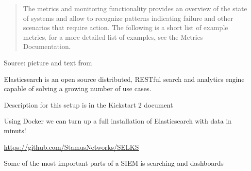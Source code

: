 \documentclass[Screen16to9,17pt]{foils}
\begin{document}

\begin{quote}
The metrics and monitoring functionality provides an overview of the state of systems and allow to recognize patterns indicating failure and other scenarios that require action. The following is a short list of example metrics, for a more detailed list of examples, see the Metrics Documentation.
\end{quote}


Source: picture and text from 






Elasticsearch is an open source distributed, RESTful search and analytics engine capable of solving a growing number of use cases.






\begin{list2}
\item Description for this setup is in the Kickstart 2 document
\item Using Docker we can turn up a full installation of Elasticsearch with data in minuts!
\item \url{https://github.com/StamusNetworks/SELKS}
\end{list2}




\begin{list2}
\item Some of the most important parts of a SIEM is searching and dashboards
\end{list2}


\end{document}
